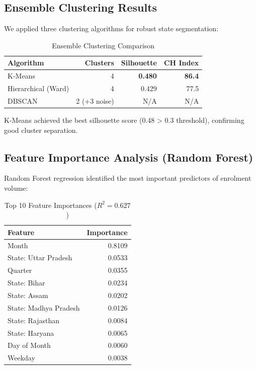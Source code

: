 \documentclass[12pt,a4paper]{article}
\begin{document}
\subsection{Ensemble Clustering Results}

We applied three clustering algorithms for robust state segmentation:

\begin{table}[H]
\centering
\caption{Ensemble Clustering Comparison}
\begin{tabular}{lrrr}
\toprule
\textbf{Algorithm} & \textbf{Clusters} & \textbf{Silhouette} & \textbf{CH Index} \\
\midrule
K-Means & 4 & \textbf{0.480} & \textbf{86.4} \\
Hierarchical (Ward) & 4 & 0.429 & 77.5 \\
DBSCAN & 2 (+3 noise) & N/A & N/A \\
\bottomrule
\end{tabular}
\end{table}

K-Means achieved the best silhouette score (0.48 > 0.3 threshold), confirming good cluster separation.

\subsection{Feature Importance Analysis (Random Forest)}

Random Forest regression identified the most important predictors of enrolment volume:

\begin{table}[H]
\centering
\caption{Top 10 Feature Importances ($R^2 = 0.627$)}
\begin{tabular}{lr}
\toprule
\textbf{Feature} & \textbf{Importance} \\
\midrule
Month & 0.8109 \\
State: Uttar Pradesh & 0.0533 \\
Quarter & 0.0355 \\
State: Bihar & 0.0234 \\
State: Assam & 0.0202 \\
State: Madhya Pradesh & 0.0126 \\
State: Rajasthan & 0.0084 \\
State: Haryana & 0.0065 \\
Day of Month & 0.0060 \\
Weekday & 0.0038 \\
\bottomrule
\end{tabular}
\end{table}
\end{document}
